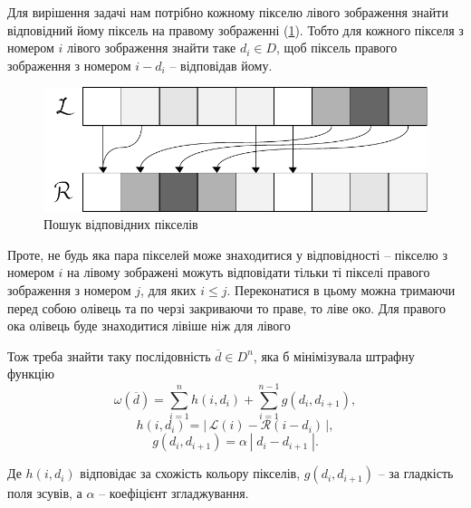 Для вирішення задачі нам потрібно кожному пікселю лівого зображення знайти відповідний йому піксель на правому зображенні (\ref{mapping}). Тобто для кожного пікселя з номером $i$ лівого зображення знайти таке $ d_i \in D$, щоб піксель правого зображення  з номером $i - d_i$ -- відповідав йому.
\begin{figure}[h!]
	\centering
	\includegraphics[scale = 1]{mapping.pdf}
	\caption{Пошук відповідних пікселів}
	\label{mapping}
\end{figure}

Проте, не будь яка пара пікселей може знаходитися у відповідності -- пікселю з номером $i$ на лівому зображені можуть відповідати тільки ті пікселі  правого зображення з номером $j$, для яких $i \leq j$. Переконатися в цьому можна тримаючи перед собою олівець та по черзі закриваючи то праве, то ліве око. Для правого ока олівець буде знаходитися лівіше ніж для лівого

Тож треба знайти таку послідовність $\overline{d} \in {D}^n$, яка б мінімізувала штрафну функцію
\begin{equation}
\omega(\overline{d}) = \sum\limits_{i = 1}^n h(i, d_i) + \sum\limits_{i = 1}^{n-1} g(d_i, d_{i + 1}),
\label{penalty}
\end{equation}
$$ h(i, d_i) = | \, \mathcal{L} (i) - \mathcal{R} (i - d_i) \, |, $$ 
$$ g(d_i, d_{i+1}) = \alpha \, | \; d_i - d_{i+1}\; |. $$

Де $ h(i, d_i) $ відповідає за схожість кольору пікселів, $ g(d_i, d_{i+1}) $ -- за гладкість поля зсувів, а $ \alpha $ -- коефіцієнт згладжування.


